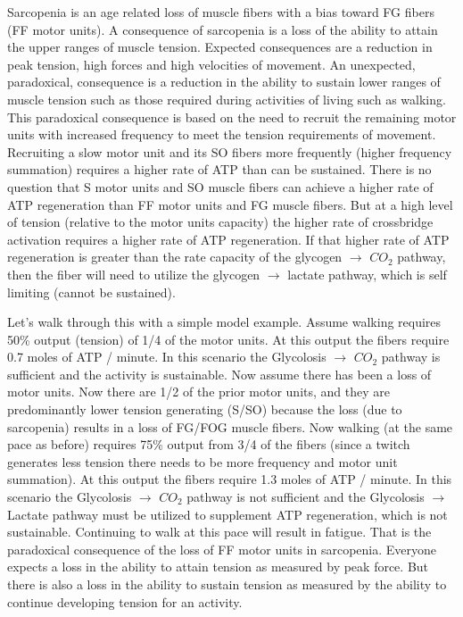 Sarcopenia is an age related loss of muscle fibers with a bias toward FG fibers (FF motor units). A consequence of sarcopenia is a loss of the ability to attain the upper ranges of muscle tension. Expected consequences are a reduction in peak tension, high forces and high velocities of movement. An unexpected, paradoxical, consequence is a reduction in the ability to sustain lower ranges of muscle tension such as those required during activities of living such as walking. This paradoxical consequence is based on the need to recruit the remaining motor units with increased frequency to meet the tension requirements of movement. Recruiting a slow motor unit and its SO fibers more frequently (higher frequency summation) requires a higher rate of ATP than can be sustained. There is no question that S motor units and SO muscle fibers can achieve a higher rate of ATP regeneration than FF motor units and FG muscle fibers. But at a high level of tension (relative to the motor units capacity) the higher rate of crossbridge activation requires a higher rate of ATP regeneration. If that higher rate of ATP regeneration is greater than the rate capacity of the glycogen $\rightarrow$ $CO_2$ pathway, then the fiber will need to utilize the glycogen $\rightarrow$ lactate pathway, which is self limiting (cannot be sustained). 

Let's walk through this with a simple model example. Assume walking requires 50\% output (tension) of 1/4 of the motor units. At this output the fibers require 0.7 moles of ATP / minute. In this scenario the Glycolosis $\rightarrow$ $CO_2$ pathway is sufficient and the activity is sustainable. Now assume there has been a loss of motor units. Now there are 1/2 of the prior motor units, and they are predominantly lower tension generating (S/SO) because the loss (due to sarcopenia) results in a loss of FG/FOG muscle fibers. Now walking (at the same pace as before) requires 75\% output from 3/4 of the fibers (since a twitch generates less tension there needs to be more frequency and motor unit summation). At this output the fibers require 1.3 moles of ATP / minute. In this scenario the Glycolosis $\rightarrow$ $CO_2$ pathway is not sufficient and the Glycolosis $\rightarrow$ Lactate pathway must be utilized to supplement ATP regeneration, which is not sustainable. Continuing to walk at this pace will result in fatigue. That is the paradoxical consequence of the loss of FF motor units in sarcopenia. Everyone expects a loss in the ability to attain tension as measured by peak force. But there is also a loss in the ability to sustain tension as measured by the ability to continue developing tension for an activity.


